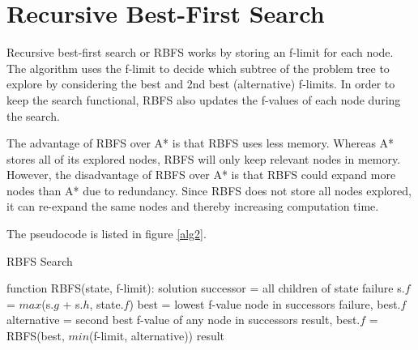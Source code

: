 \section{Recursive Best-First Search}

Recursive best-first search or RBFS works by storing an f-limit for each node. The algorithm uses the f-limit to decide which subtree of the problem tree to explore by considering the best and 2nd best (alternative) f-limits. In order to keep the search functional, RBFS also updates the f-values of each node during the search.

The advantage of RBFS over A* is that RBFS uses less memory. Whereas A* stores all of its explored nodes, RBFS will only keep relevant nodes in memory. However, the disadvantage of RBFS over A* is that RBFS could expand more nodes than A* due to redundancy. Since RBFS does not store all nodes explored, it can re-expand the same nodes and thereby increasing computation time.

The pseudocode is listed in figure \ref{alg2}.

\begin{algorithm}
\caption{RBFS Search}
\label{alg2}
\begin{algorithmic}
\STATE function RBFS(state, f-limit):
	\RETURN solution
\ENDIF
\STATE successor = all children of state
	\RETURN failure
\ELSE
		\STATE s.$f$ = $max$(s.$g$ + s.$h$, state.$f$)
	\ENDFOR
	\WHILE{\TRUE}
		\STATE best = lowest f-value node in successors
			\RETURN failure, best.$f$
		\ENDIF
		\STATE alternative = second best f-value of any node in successors
		\STATE result, best.$f$ = RBFS(best, $min$(f-limit, alternative))
			\RETURN result
		\ENDIF
	\ENDWHILE
\ENDIF
\end{algorithmic}
\end{algorithm}


